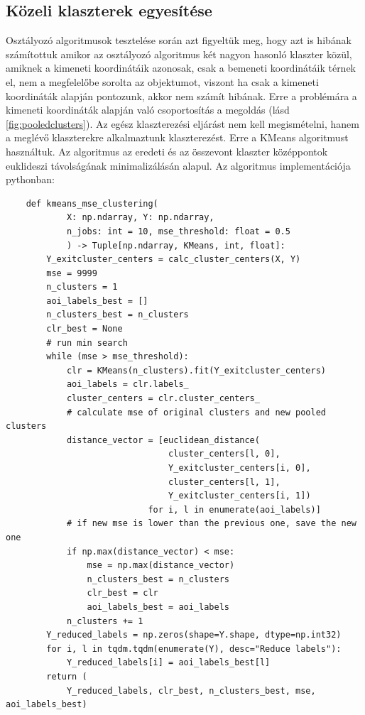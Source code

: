 \documentclass[12pt,a4paper]{article}
\begin{document}
\subsection{Közeli klaszterek egyesítése}
Osztályozó algoritmusok tesztelése során azt figyeltük meg, hogy azt is hibának számítottuk amikor az osztályozó algoritmus két nagyon hasonló klaszter közül, amiknek a kimeneti koordinátáik azonosak, csak a bemeneti koordinátáik térnek el, nem a megfelelőbe sorolta az objektumot, viszont ha csak a kimeneti koordináták alapján pontozunk, akkor nem számít hibának. Erre a problémára a kimeneti koordináták alapján való csoportosítás a megoldás (lásd \ref{fig:pooledclusters}).
Az egész klaszterezési eljárást nem kell megismételni, hanem a meglévő klaszterekre alkalmaztunk klaszterezést. Erre a KMeans algoritmust használtuk. Az algoritmus az eredeti és az összevont klaszter középpontok euklideszi távolságának minimalizálásán alapul.
Az algoritmus implementációja pythonban:
\begin{verbatim}
    def kmeans_mse_clustering(
            X: np.ndarray, Y: np.ndarray, 
            n_jobs: int = 10, mse_threshold: float = 0.5
            ) -> Tuple[np.ndarray, KMeans, int, float]:
        Y_exitcluster_centers = calc_cluster_centers(X, Y)
        mse = 9999
        n_clusters = 1
        aoi_labels_best = []
        n_clusters_best = n_clusters
        clr_best = None
        # run min search
        while (mse > mse_threshold):
            clr = KMeans(n_clusters).fit(Y_exitcluster_centers)
            aoi_labels = clr.labels_
            cluster_centers = clr.cluster_centers_
            # calculate mse of original clusters and new pooled clusters
            distance_vector = [euclidean_distance(
                                cluster_centers[l, 0], 
                                Y_exitcluster_centers[i, 0], 
                                cluster_centers[l, 1], 
                                Y_exitcluster_centers[i, 1])
                            for i, l in enumerate(aoi_labels)]
            # if new mse is lower than the previous one, save the new one
            if np.max(distance_vector) < mse:
                mse = np.max(distance_vector)
                n_clusters_best = n_clusters
                clr_best = clr
                aoi_labels_best = aoi_labels
            n_clusters += 1
        Y_reduced_labels = np.zeros(shape=Y.shape, dtype=np.int32)
        for i, l in tqdm.tqdm(enumerate(Y), desc="Reduce labels"):
            Y_reduced_labels[i] = aoi_labels_best[l]
        return (
            Y_reduced_labels, clr_best, n_clusters_best, mse, aoi_labels_best)
\end{verbatim}
\end{document}
